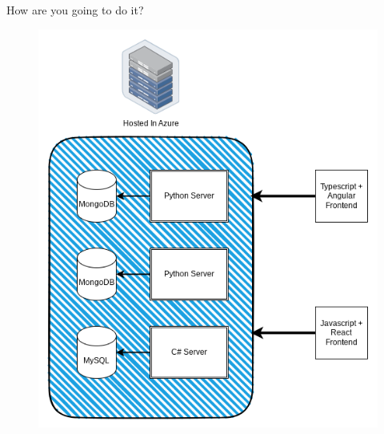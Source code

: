 \documentclass{beamer}
\begin{document}
\beamerdefaultoverlayspecification{<*>}
\begin{frame}{How are you going to do it?}
    \begin{figure}
        \centering
        \includegraphics[width=0.65\linewidth]{images/Diagram.png}
    \end{figure}
\end{frame}
\end{document}
